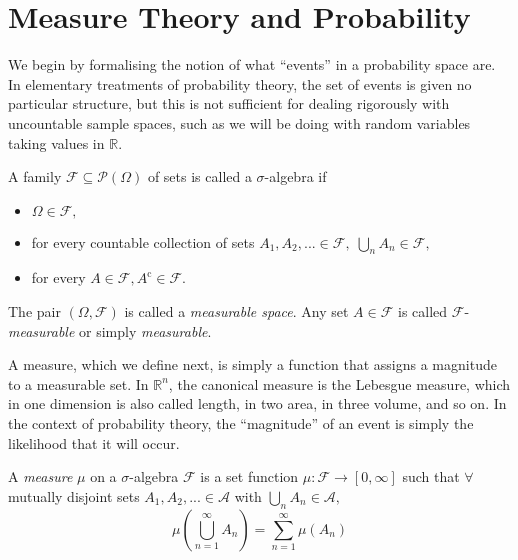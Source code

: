 \section{Measure Theory and Probability}\label{sec:1.3}

We begin by formalising the notion of what ``events'' in a probability space are.
In elementary treatments of probability theory, the set of events is given no particular 
structure, but this is not sufficient for dealing rigorously with uncountable sample 
spaces, such as we will be doing with random variables taking values in $\mathbb{R}$.

\begin{definition}
    A family $\mathcal{F}\subseteq\mathcal{P}(\Omega)$ of sets is called a $\sigma$-algebra if 
    \begin{itemize}
        \item $\Omega\in\mathcal{F},$
        \item for every countable collection of sets $A_1,A_2,...\in\mathcal{F},\;\bigcup_{n}A_n\in\mathcal{F},$
        \item for every $A\in\mathcal{F}, A^{\mathrm c}\in\mathcal{F}.$
    \end{itemize}
\end{definition}

\begin{remark}
    The pair $(\Omega,\mathcal{F})$ is called a \emph{measurable space}. Any set $A\in\mathcal{F}$
    is called $\mathcal{F}$-\emph{measurable} or simply \emph{measurable}.
\end{remark}

A measure, which we define next, is simply a function that assigns a magnitude 
to a measurable set. In $\mathbb{R}^n$, the canonical measure is the Lebesgue 
measure, which in one dimension is also called length, in two area, in three volume,
and so on. In the context of probability theory, the ``magnitude'' of an event is 
simply the likelihood that it will occur.

\begin{definition}
    A \emph{measure} $\mu$ on a $\sigma$-algebra $\mathcal{F}$ is a set function
    $\mu:\mathcal{F}\rightarrow[0,\infty]$ such that $\forall$ mutually disjoint
    sets $A_1,A_2,...\in\mathcal{A}$ with $\bigcup_nA_n\in\mathcal{A},$
    \begin{equation*}
        \mu\left(\bigcup_{n=1}^{\infty}A_n\right)=\sum_{n=1}^{\infty}\mu(A_n)
    \end{equation*}
\end{definition}

